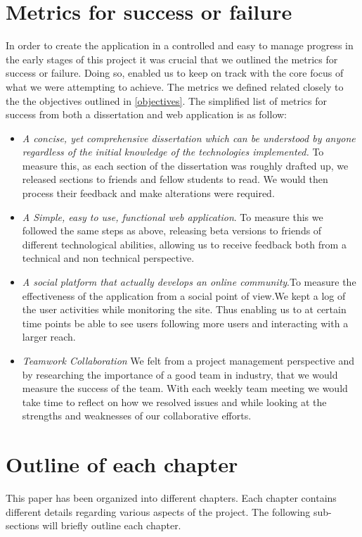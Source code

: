 \section{Metrics for success or failure} \label{metrics}
In order to create the application in a controlled and easy to manage progress in the early stages of this project it was crucial that we outlined the metrics for success or failure. Doing so, enabled us to keep on track with the core focus of what we were attempting to achieve. The metrics we defined related closely to the the objectives outlined in \ref{objectives}. The simplified list of metrics for success from both a dissertation and web application is as follow:
\begin{itemize}
  \item \textit{A concise, yet comprehensive dissertation which can be understood by anyone regardless of the initial knowledge of the technologies implemented.} To measure this, as each section of the dissertation was roughly drafted up, we released sections to friends and fellow students to read. We would then process their feedback and make alterations were required.  
  \item \textit{A Simple, easy to use, functional web application}. To measure this we followed the same steps as above, releasing beta versions to friends of different technological abilities, allowing us to receive feedback both from a technical and non technical perspective.
  \item \textit{A social platform that actually develops an online community}.To measure the effectiveness of the application from a social point of view.We kept a log of the user activities while monitoring the site. Thus enabling us to at certain time points be able to see users following more users and interacting with a larger reach.
  \item \textit{Teamwork Collaboration} We felt from a project management perspective and by researching the importance of a good team in industry, that we would measure the success of the team. With each weekly team meeting we would take time to reflect on how we resolved issues and while looking at the strengths and weaknesses of our collaborative efforts. 
\end{itemize}


\section{Outline of each chapter}
This paper has been organized into different chapters. Each chapter contains different details regarding various aspects of the project. The following sub-sections will briefly outline each chapter.


